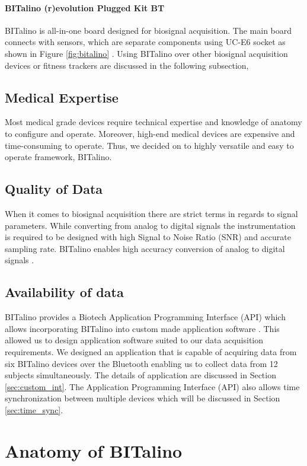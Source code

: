 \paragraph{BITalino (r)evolution Plugged Kit BT} BITalino is all-in-one board designed for biosignal acquisition. The main board connects with sensors, which are separate components using UC-E6 socket as shown in Figure \ref{fig:bitalino} \cite{bitalino_datasheet}. Using BITalino over other biosignal acquisition devices or fitness trackers are discussed in the following subsection,

\subsection{Medical Expertise} Most medical grade devices require technical expertise and knowledge of anatomy to configure and operate. Moreover, high-end medical devices are expensive and time-consuming to operate. Thus, we decided on to highly versatile and easy to operate framework, BITalino.

\subsection{Quality of Data} When it comes to biosignal acquisition there are strict terms in regards to signal parameters. While converting from analog to digital signals the instrumentation is required to be designed with high Signal to Noise Ratio (SNR) and accurate sampling rate. BITalino enables high accuracy conversion of analog to digital signals \cite{guerreiro_performance_2014}.

\subsection{Availability of data} BITalino provides a Biotech Application Programming Interface (API) which allows incorporating BITalino into custom made application software \cite{noauthor_biotech_nodate}. This allowed us to design application software suited to our data acquisition requirements. We designed an application that is capable of acquiring data from six BITalino devices over the Bluetooth enabling us to collect data from 12 subjects simultaneously. The details of application are discussed in Section \ref{sec:custom_int}. The Application Programming Interface (API) also allows time synchronization between multiple devices which will be discussed in Section \ref{sec:time_sync}.

\section{Anatomy of BITalino}
